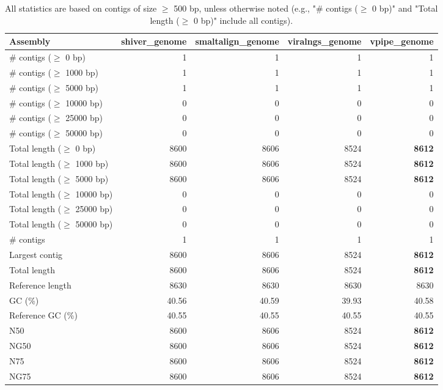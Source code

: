 \documentclass[12pt,a4paper]{article}
\begin{document}
\begin{table}[ht]
\begin{center}
\caption{All statistics are based on contigs of size $\geq$ 500 bp, unless otherwise noted (e.g., "\# contigs ($\geq$ 0 bp)" and "Total length ($\geq$ 0 bp)" include all contigs).}
\begin{tabular}{|l*{4}{|r}|}
\hline
Assembly & shiver\_genome & smaltalign\_genome & viralngs\_genome & vpipe\_genome \\ \hline
\# contigs ($\geq$ 0 bp) & 1 & 1 & 1 & 1 \\ \hline
\# contigs ($\geq$ 1000 bp) & 1 & 1 & 1 & 1 \\ \hline
\# contigs ($\geq$ 5000 bp) & 1 & 1 & 1 & 1 \\ \hline
\# contigs ($\geq$ 10000 bp) & 0 & 0 & 0 & 0 \\ \hline
\# contigs ($\geq$ 25000 bp) & 0 & 0 & 0 & 0 \\ \hline
\# contigs ($\geq$ 50000 bp) & 0 & 0 & 0 & 0 \\ \hline
Total length ($\geq$ 0 bp) & 8600 & 8606 & 8524 & {\bf 8612} \\ \hline
Total length ($\geq$ 1000 bp) & 8600 & 8606 & 8524 & {\bf 8612} \\ \hline
Total length ($\geq$ 5000 bp) & 8600 & 8606 & 8524 & {\bf 8612} \\ \hline
Total length ($\geq$ 10000 bp) & 0 & 0 & 0 & 0 \\ \hline
Total length ($\geq$ 25000 bp) & 0 & 0 & 0 & 0 \\ \hline
Total length ($\geq$ 50000 bp) & 0 & 0 & 0 & 0 \\ \hline
\# contigs & 1 & 1 & 1 & 1 \\ \hline
Largest contig & 8600 & 8606 & 8524 & {\bf 8612} \\ \hline
Total length & 8600 & 8606 & 8524 & {\bf 8612} \\ \hline
Reference length & 8630 & 8630 & 8630 & 8630 \\ \hline
GC (\%) & 40.56 & 40.59 & 39.93 & 40.58 \\ \hline
Reference GC (\%) & 40.55 & 40.55 & 40.55 & 40.55 \\ \hline
N50 & 8600 & 8606 & 8524 & {\bf 8612} \\ \hline
NG50 & 8600 & 8606 & 8524 & {\bf 8612} \\ \hline
N75 & 8600 & 8606 & 8524 & {\bf 8612} \\ \hline
NG75 & 8600 & 8606 & 8524 & {\bf 8612} \\ \hline

\end{tabular}
\end{center}
\end{table}
\end{document}

